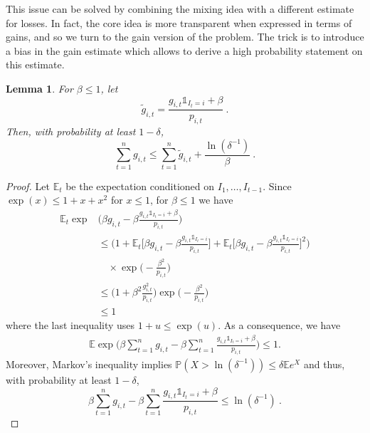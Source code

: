 \documentclass[11pt]{hackednow}
\newtheorem{lemma}{Lemma}[chapter]
\renewcommand{\P}{\mathbb{P}}
\newcommand{\E}{\mathbb{E}}
\def\ds1{\mathds{1}}
\renewcommand{\tilde}{\widetilde}
\begin{document}
This issue can be solved by combining the mixing idea with a different estimate for losses. In fact, the core idea is more transparent when expressed in terms of gains, and so we turn to the gain version of the problem. The trick is to introduce a bias in the gain estimate which allows to derive a high probability statement on this estimate.
\begin{lemma} \label{lem:exp3P}
For $\beta \le 1$, let
\[
    \tilde{g}_{i,t} = \frac{g_{i,t} \ds1_{I_t=i} + \beta}{p_{i,t}}~.
\]
Then, with probability at least $1-\delta$,
$$\sum_{t=1}^n g_{i,t} \leq \sum_{t=1}^n \tilde{g}_{i,t}  + \frac{\ln(\delta^{-1})}{\beta}~.$$
\end{lemma}
\begin{proof}
Let $\E_t$ be the expectation conditioned on $I_1,\dots,I_{t-1}$. Since $\exp(x)\le 1+x+x^2$ for $x\leq 1$, for $\beta\leq 1$ we have
\begin{align*}
    \E_t \exp&\bigg(\beta g_{i,t} - \beta \frac{g_{i,t} \ds1_{I_t=i} + \beta}{p_{i,t}}\bigg)
\\ &\leq
    \Bigg(1 + \E_t \bigg[\beta g_{i,t} - \beta \frac{g_{i,t} \ds1_{I_t=i}}{p_{i,t}}\bigg] + \E_t \bigg[\beta g_{i,t} - \beta \frac{g_{i,t} \ds1_{I_t=i}}{p_{i,t}}\bigg]^2 \Bigg)
\\ &\quad
    \times\exp\bigg(\!- \frac{\beta^2}{p_{i,t}}\bigg)
\\ &\leq
    \Bigg(1 + \beta^2 \frac{g^2_{i,t}}{p_{i,t}} \Bigg) \exp\bigg(\!- \frac{\beta^2}{p_{i,t}}\bigg)
\\ &\leq
     1
\end{align*}
where the last inequality uses $1+u \leq \exp(u)$. As a consequence, we have
  \begin{align*}
  \E \exp\bigg(\beta \sum_{t=1}^n g_{i,t} - \beta \sum_{t=1}^n \frac{g_{i,t} \ds1_{I_t=i} + \beta}{p_{i,t}}\bigg) \leq 1.
  \end{align*}
Moreover, Markov's inequality implies $\P\left(X>\ln(\delta^{-1})\right) \leq \delta \E e^X$ and thus, with probability at least $1-\delta$,
$$\beta \sum_{t=1}^n g_{i,t} - \beta \sum_{t=1}^n \frac{g_{i,t} \ds1_{I_t=i} + \beta}{p_{i,t}} \leq \ln(\delta^{-1})~.$$
\end{proof}
\end{document}
